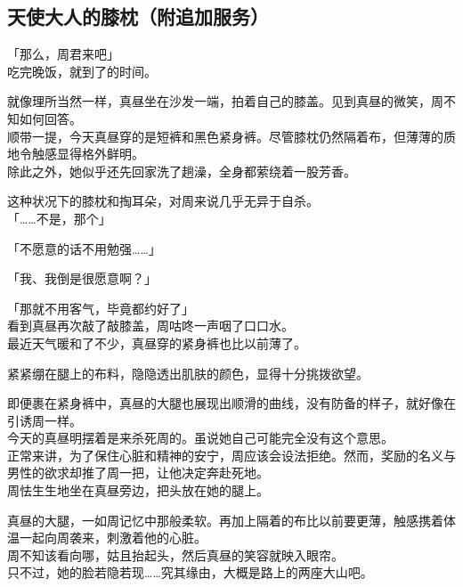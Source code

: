 \subsection{天使大人的膝枕（附追加服务）}

「那么，周君来吧」\\

吃完晚饭，就到了的时间。

就像理所当然一样，真昼坐在沙发一端，拍着自己的膝盖。见到真昼的微笑，周不知如何回答。\\

顺带一提，今天真昼穿的是短裤和黑色紧身裤。尽管膝枕仍然隔着布，但薄薄的质地令触感显得格外鲜明。\\

除此之外，她似乎还先回家洗了趟澡，全身都萦绕着一股芳香。

这种状况下的膝枕和掏耳朵，对周来说几乎无异于自杀。\\

「……不是，那个」

「不愿意的话不用勉强……」

「我、我倒是很愿意啊？」

「那就不用客气，毕竟都约好了」\\

看到真昼再次敲了敲膝盖，周咕咚一声咽了口口水。\\

最近天气暖和了不少，真昼穿的紧身裤也比以前薄了。

紧紧绷在腿上的布料，隐隐透出肌肤的颜色，显得十分挑拨欲望。

即便裹在紧身裤中，真昼的大腿也展现出顺滑的曲线，没有防备的样子，就好像在引诱周一样。\\

今天的真昼明摆着是来杀死周的。虽说她自己可能完全没有这个意思。\\

正常来讲，为了保住心脏和精神的安宁，周应该会设法拒绝。然而，奖励的名义与男性的欲求却推了周一把，让他决定奔赴死地。\\

周怯生生地坐在真昼旁边，把头放在她的腿上。

真昼的大腿，一如周记忆中那般柔软。再加上隔着的布比以前要更薄，触感携着体温一起向周袭来，刺激着他的心脏。\\

周不知该看向哪，姑且抬起头，然后真昼的笑容就映入眼帘。\\

只不过，她的脸若隐若现……究其缘由，大概是路上的两座大山吧。\\


